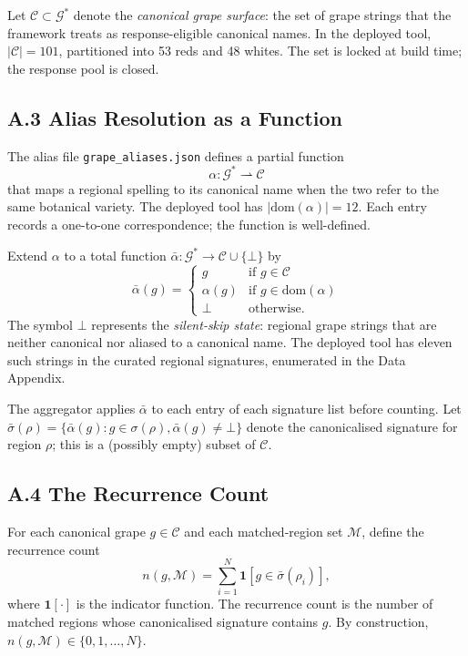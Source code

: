 \documentclass[11pt]{article}
\providecommand{\indicator}{\mathbf{1}}
\begin{document}
Let $\mathcal{C} \subset \mathcal{G}^{*}$ denote the \emph{canonical grape surface}: the set of grape strings that the framework treats as response-eligible canonical names. In the deployed tool, $|\mathcal{C}| = 101$, partitioned into 53 reds and 48 whites. The set is locked at build time; the response pool is closed.

\subsection*{A.3 Alias Resolution as a Function}
The alias file \texttt{grape\_aliases.json} defines a partial function
\[
\alpha : \mathcal{G}^{*} \rightharpoonup \mathcal{C}
\]
that maps a regional spelling to its canonical name when the two refer to the same botanical variety. The deployed tool has $|\mathrm{dom}(\alpha)| = 12$. Each entry records a one-to-one correspondence; the function is well-defined.

Extend $\alpha$ to a total function $\bar\alpha : \mathcal{G}^{*} \to \mathcal{C} \cup \{\bot\}$ by
\[
\bar\alpha(g) =
\begin{cases}
g                & \text{if } g \in \mathcal{C} \\
\alpha(g)        & \text{if } g \in \mathrm{dom}(\alpha) \\
\bot             & \text{otherwise.}
\end{cases}
\]
The symbol $\bot$ represents the \emph{silent-skip state}: regional grape strings that are neither canonical nor aliased to a canonical name. The deployed tool has eleven such strings in the curated regional signatures, enumerated in the Data Appendix.

The aggregator applies $\bar\alpha$ to each entry of each signature list before counting. Let $\bar\sigma(\rho) = \{ \bar\alpha(g) : g \in \sigma(\rho), \bar\alpha(g) \neq \bot \}$ denote the canonicalised signature for region $\rho$; this is a (possibly empty) subset of $\mathcal{C}$.

\subsection*{A.4 The Recurrence Count}
For each canonical grape $g \in \mathcal{C}$ and each matched-region set $\mathcal{M}$, define the recurrence count
\[
n(g, \mathcal{M}) = \sum_{i=1}^{N} \indicator[g \in \bar\sigma(\rho_i)],
\]
where $\indicator[\cdot]$ is the indicator function. The recurrence count is the number of matched regions whose canonicalised signature contains $g$. By construction, $n(g, \mathcal{M}) \in \{0, 1, \ldots, N\}$.
\end{document}
